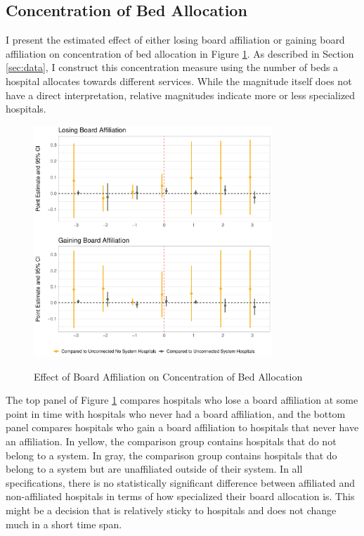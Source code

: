 \documentclass[12pt]{article}
\begin{document}
    \subsection{Concentration of Bed Allocation}

    I present the estimated effect of either losing board affiliation or gaining board affiliation on concentration of bed allocation in Figure \ref{fig:aha_hhi_did}. As described in Section \ref{sec:data}, I construct this concentration measure using the number of beds a hospital allocates towards different services. While the magnitude itself does not have a direct interpretation, relative magnitudes indicate more or less specialized hospitals. 

    \begin{figure}[ht!]
        \centering
        \caption{Effect of Board Affiliation on Concentration of Bed Allocation}
        \includegraphics[width=0.8\textwidth]{Objects/aha_hhi_did.pdf}
        \label{fig:aha_hhi_did}
    \end{figure}

    The top panel of Figure \ref{fig:aha_hhi_did} compares hospitals who lose a board affiliation at some point in time with hospitals who never had a board affiliation, and the bottom panel compares hospitals who gain a board affiliation to hospitals that never have an affiliation. In yellow, the comparison group contains hospitals that do not belong to a system. In gray, the comparison group contains hospitals that do belong to a system but are unaffiliated outside of their system. In all specifications, there is no statistically significant difference between affiliated and non-affiliated hospitals in terms of how specialized their board allocation is. This might be a decision that is relatively sticky to hospitals and does not change much in a short time span.  
\end{document}
